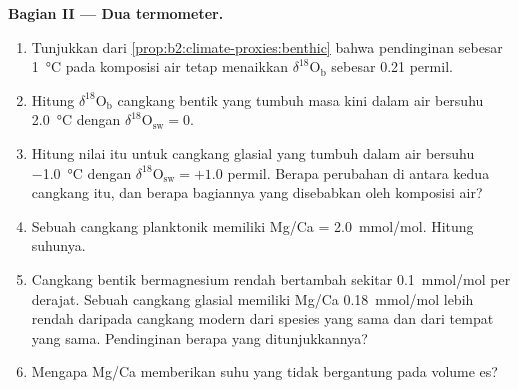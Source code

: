 \begin{problem}
\medskip\noindent\textbf{Bagian II --- Dua termometer.}
\begin{enumerate}[resume]
  \item Tunjukkan dari \cref{prop:b2:climate-proxies:benthic} bahwa pendinginan sebesar \qty{1}{\celsius} pada
        komposisi air tetap menaikkan $\delta^{18}\mathrm{O}_{\mathrm{b}}$ sebesar \num{0.21} permil.
  \item Hitung $\delta^{18}\mathrm{O}_{\mathrm{b}}$ cangkang bentik yang tumbuh masa kini dalam air bersuhu
        \qty{2.0}{\celsius} dengan $\delta^{18}\mathrm{O}_{\mathrm{sw}} = 0$.
  \item Hitung nilai itu untuk cangkang glasial yang tumbuh dalam air bersuhu \qty{-1.0}{\celsius} dengan
        $\delta^{18}\mathrm{O}_{\mathrm{sw}} = +1.0$ permil. Berapa perubahan di antara kedua
        cangkang itu, dan berapa bagiannya yang disebabkan oleh komposisi air?
  \item Sebuah cangkang planktonik memiliki Mg/Ca = \qty{2.0}{mmol/mol}. Hitung suhunya.
  \item Cangkang bentik bermagnesium rendah bertambah sekitar \qty{0.1}{mmol/mol} per derajat. Sebuah cangkang glasial memiliki
        Mg/Ca \qty{0.18}{mmol/mol} lebih rendah daripada cangkang modern dari spesies yang sama dan dari tempat
        yang sama. Pendinginan berapa yang ditunjukkannya?
  \item Mengapa Mg/Ca memberikan suhu yang tidak bergantung pada volume es?
\end{enumerate}


\end{problem}
